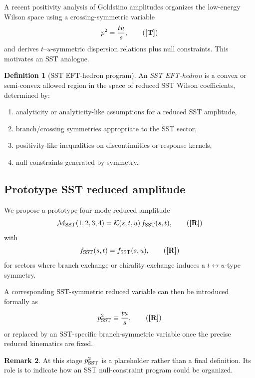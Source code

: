 \documentclass[11pt]{article}
\newcommand{\TagT}{\textbf{[T]}} %
\newcommand{\TagR}{\textbf{[R]}} %
\theoremstyle{definition}
\newtheorem{definition}{Definition}[section]
\newtheorem{remark}[definition]{Remark}
\theoremstyle{plain}
\begin{document}
A recent positivity analysis of Goldstino amplitudes organizes the low-energy Wilson space using a crossing-symmetric variable
\begin{equation}
p^2=\frac{tu}{s},
\tag{\TagT}
\label{eq:p2}
\end{equation}
and derives \(t\)–\(u\)-symmetric dispersion relations plus null constraints. This motivates an SST analogue.

\begin{definition}[SST EFT-hedron program]
An \emph{SST EFT-hedron} is a convex or semi-convex allowed region in the space of reduced SST Wilson coefficients, determined by:
\begin{enumerate}[label=(\roman*)]
\item analyticity or analyticity-like assumptions for a reduced SST amplitude,
\item branch/crossing symmetries appropriate to the SST sector,
\item positivity-like inequalities on discontinuities or response kernels,
\item null constraints generated by symmetry.
\end{enumerate}
\tag{\TagR}
\label{def:efthedron}
\end{definition}

\subsection{Prototype SST reduced amplitude}

We propose a prototype four-mode reduced amplitude
\begin{equation}
\mathcal M_{\rm SST}(1,2,3,4)=\mathcal K(s,t,u)\,f_{\rm SST}(s,t),
\tag{\TagR}
\label{eq:MSST}
\end{equation}
with
\begin{equation}
f_{\rm SST}(s,t)=f_{\rm SST}(s,u),
\tag{\TagR}
\label{eq:fsym}
\end{equation}
for sectors where branch exchange or chirality exchange induces a \(t\leftrightarrow u\)-type symmetry.

A corresponding SST-symmetric reduced variable can then be introduced formally as
\begin{equation}
p_{\rm SST}^2 \equiv \frac{tu}{s},
\tag{\TagR}
\label{eq:pSST}
\end{equation}
or replaced by an SST-specific branch-symmetric variable once the precise reduced kinematics are fixed.

\begin{remark}
At this stage \(p_{\rm SST}^2\) is a placeholder rather than a final definition. Its role is to indicate how an SST null-constraint program could be organized.
\end{remark}
\end{document}
